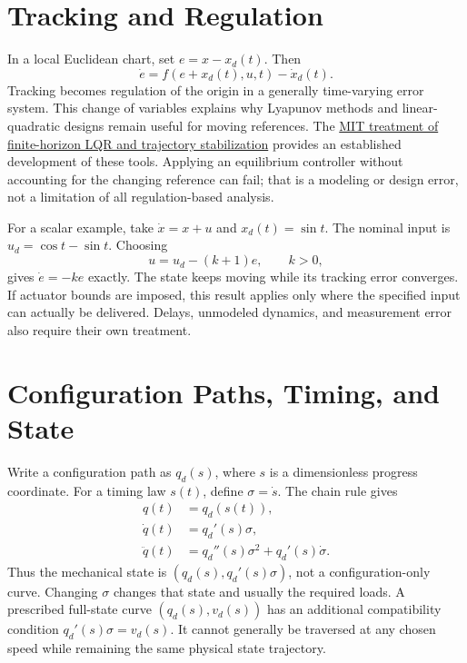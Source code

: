 \documentclass[12pt, openany]{book}
\theoremstyle{plain}
\begin{document}
\section{Tracking and Regulation}

In a local Euclidean chart, set $e=x-x_d(t)$. Then
\begin{equation}
 \dot e=f(e+x_d(t),u,t)-\dot x_d(t).
 \label{eq:motion_error_dynamics}
\end{equation}
Tracking becomes regulation of the origin in a generally time-varying error
system. This change of variables explains why Lyapunov methods and
linear-quadratic designs remain useful for moving references. The
\href{https://underactuated.mit.edu/lqr.html}{MIT treatment of finite-horizon LQR and trajectory stabilization}
provides an established development of these tools. Applying an equilibrium
controller without accounting for the changing reference can fail; that is a
modeling or design error, not a limitation of all regulation-based analysis.

For a scalar example, take $\dot x=x+u$ and $x_d(t)=\sin t$. The nominal input
is $u_d=\cos t-\sin t$. Choosing
\begin{equation}
 u=u_d-(k+1)e,\qquad k>0,
 \label{eq:motion_tracking_example}
\end{equation}
gives $\dot e=-ke$ exactly. The state keeps moving while its tracking error
converges. If actuator bounds are imposed, this result applies only where the
specified input can actually be delivered. Delays, unmodeled dynamics, and
measurement error also require their own treatment.

\section{Configuration Paths, Timing, and State}

Write a configuration path as $q_d(s)$, where $s$ is a dimensionless progress
coordinate. For a timing law $s(t)$, define $\sigma=\dot s$. The chain rule gives
\begin{equation}
 \begin{aligned}
 q(t)&=q_d(s(t)),\\
 \dot q(t)&=q_d'(s)\sigma,\\
 \ddot q(t)&=q_d''(s)\sigma^2+q_d'(s)\dot\sigma.
 \end{aligned}
 \label{eq:motion_path_timing}
\end{equation}
Thus the mechanical state is $(q_d(s),q_d'(s)\sigma)$, not a configuration-only
curve. Changing $\sigma$ changes that state and usually the required loads.
A prescribed full-state curve $(q_d(s),v_d(s))$ has an additional compatibility
condition $q_d'(s)\sigma=v_d(s)$. It cannot generally be traversed at any chosen
speed while remaining the same physical state trajectory.
\end{document}
